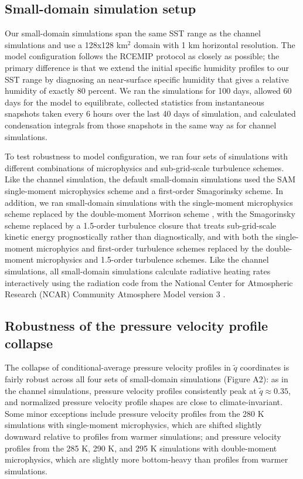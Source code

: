 \documentclass[twocol]{ametsoc}
\begin{document}
\subsection{Small-domain simulation setup}

Our small-domain simulations span the same SST range as the channel simulations and use a 128x128 km$^2$ domain with 1 km horizontal resolution. The model configuration follows the RCEMIP protocol \citep{Wing2018Radiative-convectiveProject} as closely as possible; the primary difference is that we extend the initial specific humidity profiles to our SST range by diagnosing an near-surface specific humidity that gives a relative humidity of exactly 80 percent. We ran the simulations for 100 days, allowed 60 days for the model to equilibrate, collected statistics from instantaneous snapshots taken every 6 hours over the last 40 days of simulation, and calculated condensation integrals from those snapshots in the same way as for channel simulations.

To test robustness to model configuration, we ran four sets of simulations with different combinations of microphysics and sub-grid-scale turbulence schemes. Like the channel simulation, the default small-domain simulations used the SAM single-moment microphysics scheme \citep{Khairoutdinov2003CloudSensitivities} and a first-order Smagorinsky scheme. In addition, we ran small-domain simulations with the single-moment microphysics scheme replaced by the double-moment Morrison scheme \citep{Morrison2005ADescription}, with the Smagorinsky scheme replaced by a 1.5-order turbulence closure that treats sub-grid-scale kinetic energy prognostically rather than diagnostically, and with both the single-moment microphyics and first-order turbulence schemes replaced by the double-moment microphysics and 1.5-order turbulence schemes. Like the channel simulations, all small-domain simulations calculate radiative heating rates interactively using the radiation code from the National Center for Atmospheric Research (NCAR) Community Atmosphere Model version 3 \citep[CAM,][]{Collins2006TheCAM3}.

\subsection{Robustness of the pressure velocity profile collapse}
\label{app:rce_collapse}

The collapse of conditional-average pressure velocity profiles in $\tilde{q}$ coordinates is fairly robust across all four sets of small-domain simulations (Figure A2): as in the channel simulations, pressure velocity profiles consistently peak at $\tilde{q} \approx 0.35$, and normalized pressure velocity profile shapes are close to climate-invariant. Some minor exceptions include pressure velocity profiles from the 280 K simulations with single-moment microphysics, which are shifted slightly downward relative to profiles from warmer simulations; and pressure velocity profiles from the 285 K, 290 K, and 295 K simulations with double-moment microphysics, which are slightly more bottom-heavy than profiles from warmer simulations.
\end{document}
